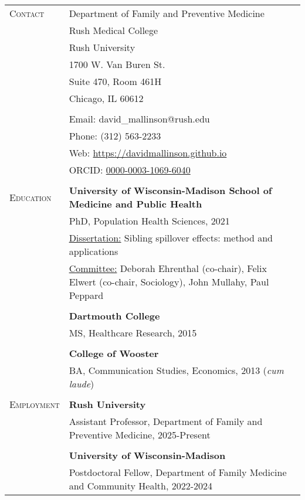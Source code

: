 \documentclass[letterpaper,10pt,oneside]{article}
\begin{document}
\begin{longtable}{@{} p{} p{}}
\textsc{Contact}   & Department of Family and Preventive Medicine \\
     & Rush Medical College \\
     & Rush University \\ 
     & 1700 W. Van Buren St. \\
     & Suite 470, Room 461H \\
     & Chicago, IL 60612 \\
     & \\
     & Email: david\_mallinson@rush.edu \\
     & Phone: (312) 563-2233 \\
     & Web: \href{https://davidmallinson.github.io}{https://davidmallinson.github.io} \\
     & ORCID: \href{https://orcid.org/0000-0003-1069-6040/}{0000-0003-1069-6040} \\
     & \\
\textsc{Education}    & \textbf{University of Wisconsin-Madison School of Medicine and Public Health} \\
     & PhD, Population Health Sciences, 2021 \\
     & \parbox{6.15in}{\underline{Dissertation:} Sibling spillover effects: method and applications} \\
     & \parbox{6.15in}{\underline{Committee:} Deborah Ehrenthal (co-chair), Felix Elwert (co-chair, Sociology), John Mullahy, Paul Peppard} \\
     & \\
     & \textbf{Dartmouth College} \\
     & MS, Healthcare Research, 2015 \\
     & \\
     & \textbf{College of Wooster} \\
     & BA, Communication Studies, Economics, 2013 (\textit{cum laude}) \\
     & \\
\textsc{Employment} & \textbf{Rush University} \\
     & Assistant Professor, Department of Family and Preventive Medicine, 2025-Present \\
     & \\
     & \textbf{University of Wisconsin-Madison} \\
     & Postdoctoral Fellow, Department of Family Medicine and Community Health, 2022-2024 \\

\end{longtable}
\end{document}
